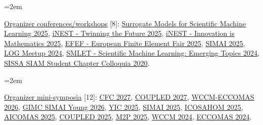 \documentclass[
  usegeometry%
]{scrartcl}
\newcommand{\Description}[1]{\hangindent=2em\hangafter=0\noindent\raggedright\footnotesize{#1}\par\normalsize\vspace{1em}} %
\begin{document}
\begin{cv}{}
\Description{\underline{Organizer conferences/workshops} [8]: \href{https://inest.spoke9.sissa.it/it/modelli-surrogati-e-machine-learning-scientifico-al-centro-di-un-nuovo-ciclo-di-incontri/}{Surrogate Models for Scientific Machine Learning 2025}, \href{https://inest.spoke9.sissa.it/it/innovation-is-mathematics-una-celebrazione-della-matematica-applicata-con-il-supporto-dello-spoke-9/}{iNEST - Twinning the Future 2025}, \href{https://inest.spoke9.sissa.it/it/innovation-is-mathematics-una-celebrazione-della-matematica-applicata-con-il-supporto-dello-spoke-9/}{iNEST - Innovation is Mathematics 2025}, \href{https://indico.sissa.it/event/153/}{EFEF - European Finite Element Fair 2025}, \href{https://simai2025.cimne.com}{SIMAI 2025}, \href{https://sites.google.com/student.unisi.it/log24siena/home-page}{LOG Meetup 2024}, \href{https://indico.sissa.it/event/107/}{SMLET - Scientific Machine Learning: Emerging Topics 2024}, \href{https://www.math.sissa.it/seminar/siam-chapter-colloquia-2020}{SISSA SIAM Student Chapter Colloquia 2020}.}
\Description{\underline{Organizer mini-symposia} [12]:  \href{https://cfc2027.iacm.info}{CFC 2027}, \href{https://coupled2027.cimne.com}{COUPLED 2027}, \href{https://wccm-eccomas2026.org}{WCCM-ECCOMAS 2026}, \href{https://events.dm.unipi.it/event/331/}{GIMC SIMAI Young 2026}, \href{https://yic2025.cimne.com}{YIC 2025}, \href{https://simai2025.cimne.com}{SIMAI 2025}, \href{https://icosahom2025.org}{ICOSAHOM 2025}, \href{https://dte_aicomas_2025.iacm.info}{AICOMAS 2025}, \href{https://coupled2025.cimne.com}{COUPLED 2025}, \href{https://www.m2p2025.com/m2p2025}{M2P 2025}, \href{https://www.wccm2024.org}{WCCM 2024}, \href{https://eccomas2024.org}{ECCOMAS 2024}.}




\end{cv}
\end{document}
